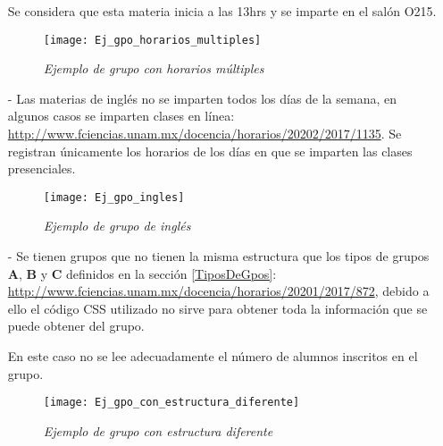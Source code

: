 \begin{itemize}
Se considera que esta materia inicia a las 13hrs y se imparte en el salón O215.
  
\begin{figure}[H]
\centering
\texttt{[image: Ej\_gpo\_horarios\_multiples]} %
\caption{\textit{Ejemplo de grupo con horarios múltiples}}
\end{figure}
  
\item[-] Las materias de inglés no se imparten todos los días de la semana, en algunos casos se imparten clases en línea: \url{http://www.fciencias.unam.mx/docencia/horarios/20202/2017/1135}. Se registran únicamente los horarios de los días en que se imparten las clases presenciales.

\begin{figure}[H]
\centering
\texttt{[image: Ej\_gpo\_ingles]} %
\caption{\textit{Ejemplo de grupo de inglés}}
\end{figure}

\item[-] Se tienen grupos que no tienen la misma estructura que los tipos de grupos \textbf{A}, \textbf{B} y \textbf{C} definidos en la sección \ref{TiposDeGpos}: \url{http://www.fciencias.unam.mx/docencia/horarios/20201/2017/872}, debido a ello el código CSS utilizado no sirve para obtener toda la información que se puede obtener del grupo.

En este caso no se lee adecuadamente el número de alumnos inscritos en el grupo.

\begin{figure}[H]
\centering
\texttt{[image: Ej\_gpo\_con\_estructura\_diferente]} %
\caption{\textit{Ejemplo de grupo con estructura diferente}}
\end{figure}

\end{itemize}